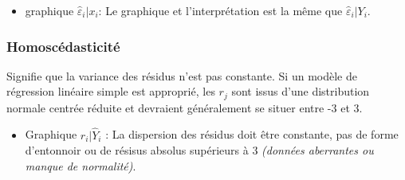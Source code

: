 \documentclass[10pt, french]{article}
\begin{document}
\begin{multicols*}{3}
\begin{itemize}

\item graphique $\hat{\varepsilon}_i | x_i$: Le graphique et l'interprétation est la même que $\hat{\varepsilon}_i | Y_i$.
\end{itemize}

\subsubsection*{Homoscédasticité}
Signifie que la variance des résidus n'est pas constante.
Si un modèle de régression linéaire simple est approprié, les $r_{j}$ sont issus d'une distribution normale centrée réduite et devraient généralement se situer entre -3 et 3.
\begin{itemize}
\item Graphique $r_i | \hat{Y}_i$ : La dispersion des résidus doit être constante, pas de forme d'entonnoir ou de résisus absolus supérieurs à 3 \textit{(données aberrantes ou manque de normalité)}.





\end{itemize}
\end{multicols*}
\end{document}
